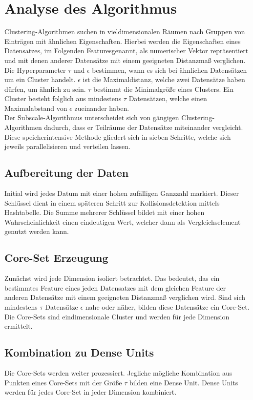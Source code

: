 \section{Analyse des Algorithmus}
Clustering-Algorithmen suchen in vieldimensionalen Räumen nach Gruppen von Einträgen mit ähnlichen Eigenschaften. Hierbei werden die Eigenschaften eines Datensatzes, im Folgenden \glqq Features\grqq genannt, als numerischer Vektor repräsentiert und mit denen anderer Datensätze mit einem geeigneten Distanzmaß verglichen. Die Hyperparameter $\tau$ und $\epsilon$ bestimmen, wann es sich bei ähnlichen Datensätzen um ein Cluster handelt. $\epsilon$ ist die Maximaldistanz, welche zwei Datensätze haben dürfen, um ähnlich zu sein. $\tau$ bestimmt die Minimalgröße eines Clusters. Ein Cluster besteht folglich aus mindestens $\tau$ Datensätzen, welche einen Maximalabstand von $\epsilon$ zueinander haben.\\
Der Subscale-Algorithmus unterscheidet sich von gängigen Clustering-Algorithmen dadurch, dass er Teilräume der Datensätze miteinander vergleicht. Diese speicherintensive Methode gliedert sich in sieben Schritte, welche sich jeweils parallelisieren und verteilen 
lassen.

\subsection{Aufbereitung der Daten}
Initial wird jedes Datum mit einer hohen zufälligen Ganzzahl markiert. Dieser Schlüssel dient in einem späteren Schritt zur Kollisionsdetektion mittels Hashtabelle. Die Summe mehrerer Schlüssel bildet mit einer hohen Wahrscheinlichkeit einen eindeutigen Wert, 
welcher dann als Vergleichselement genutzt werden kann.

\subsection{Core-Set Erzeugung}
Zunächst wird jede Dimension isoliert betrachtet. Das bedeutet, das ein bestimmtes Feature eines jeden Datensatzes mit dem gleichen Feature der anderen Datensätze mit einem geeigneten Distanzmaß verglichen wird. Sind sich mindestens $\tau$ Datensätze $\epsilon$ nahe oder näher, bilden diese Datensätze ein Core-Set. Die Core-Sets sind eindimensionale Cluster und werden für jede Dimension ermittelt.

\subsection{Kombination zu Dense Units}
Die Core-Sets werden weiter prozessiert. Jegliche mögliche Kombination aus Punkten eines Core-Sets mit der Größe $\tau$ bilden eine Dense Unit. Dense Units werden für jedes Core-Set in jeder Dimension kombiniert.

